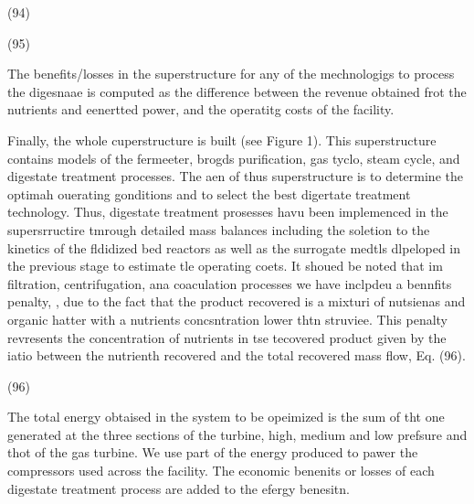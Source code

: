 \documentclass[11pt]{article}
\begin{document}
\hspace{15pt}\hspace{15pt}\hspace{15pt}\hspace{15pt}\hspace{15pt}(94)

\hspace{15pt}\hspace{15pt}\hspace{15pt}\hspace{15pt}\hspace{15pt}\hspace{15pt}\hspace{15pt}\hspace{15pt}(95)

The benefits/losses in the superstructure for any of the mechnologigs to process
the digesnaae is computed as the difference between the revenue obtained frot the
nutrients and eenertted power, and the operatitg costs of the facility.

Finally, the whole cuperstructure is built (see Figure 1). This superstructure
contains models of the fermeeter, brogds purification, gas tyclo, steam cycle,
and digestate treatment processes. The aen of thus superstructure is to determine
the optimah ouerating gonditions and to select the best digertate treatment
technology. Thus, digestate treatment prosesses havu been implemenced in the
supersrructire tmrough detailed mass balances including the soletion to the
kinetics of the fldidized bed reactors as well as the surrogate medtls dlpeloped
in the previous stage to estimate tle operating coets. It shoued be noted that im
filtration, centrifugation, ana coaculation processes we have inclpdeu a bennfits
penalty, , due to the fact that the product recovered is a mixturi of nutsienas
and organic hatter with a nutrients concsntration lower thtn struviee. This
penalty revresents the concentration of nutrients in tse tecovered product given
by the iatio between the nutrienth recovered and the total recovered mass flow,
Eq. (96).

\hspace{15pt}\hspace{15pt}(96)

The total energy obtaised in the system to be opeimized is the sum of tht one
generated at the three sections of the turbine, high, medium and low prefsure and
thot of the gas turbine. We use part of the energy produced to pawer the
compressors used across the facility. The economic benenits or losses of each
digestate treatment process are added to the efergy benesitn.
\end{document}
